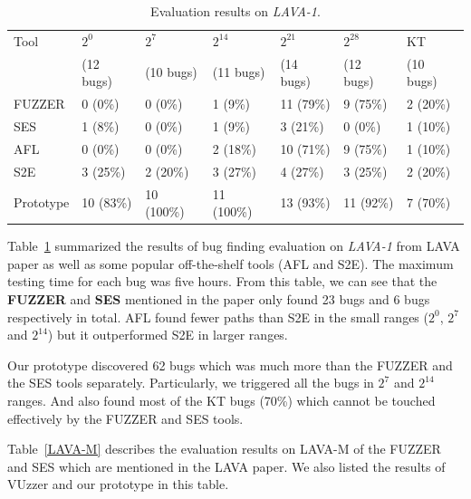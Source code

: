 \begin{table}
  \caption{\label{LAVA-1}Evaluation results on \textit{LAVA-1}.}
  \centering
	\begin{tabular}{p{2cm}<{\centering} p{1.5cm}<{\centering} p{1.6cm}<{\centering}  p{1.6cm}<{\centering}	p{1.5cm}<{\centering} p{1.5cm}<{\centering}  p{1.5cm}<{\centering} }
		\toprule
	    Tool & $2^0$ & $2^7$  & $2^{14}$ & $2^{21}$ & $2^{28}$ & KT \\
	         & (12 bugs) & (10 bugs) & (11 bugs) & (14 bugs) & (12 bugs) & (10 bugs) \\
		\midrule
		FUZZER 		& 0 (0\%)   & 0 (0\%)    & 1 (9\%)    & 11 (79\%) & 9 (75\%)  & 2 (20\%) \\
		SES	        & 1 (8\%)   & 0 (0\%)    & 1 (9\%)    & 3 (21\%)  & 0 (0\%)   & 1 (10\%) \\
		AFL		    & 0 (0\%)   & 0 (0\%)    & 2 (18\%)   & 10 (71\%) & 9 (75\%)  & 1 (10\%) \\
		S2E			& 3 (25\%)  & 2 (20\%)   & 3 (27\%)   & 4 (27\%)  & 3 (25\%)  & 2 (20\%) \\
		Prototype	& 10 (83\%) & 10 (100\%) & 11 (100\%) & 13 (93\%) & 11 (92\%) & 7 (70\%) \\
	 \bottomrule
	\end{tabular}
\end{table}

Table~\ref{LAVA-1} summarized the results of bug finding evaluation on \textit{LAVA-1} from LAVA paper as well as some popular off-the-shelf tools (AFL and S2E). The maximum testing time for each bug was five hours. From this table, we can see that the \textbf{FUZZER} and \textbf{SES} mentioned in the paper only found 23 bugs and 6 bugs respectively in total. AFL found fewer paths than S2E in the small ranges ($2^0$, $2^7$ and $2^{14}$) but it outperformed S2E in larger ranges. 

Our prototype discovered 62 bugs which was much more than the FUZZER and the SES tools separately. Particularly, we triggered all the bugs in $2^7$ and $2^{14}$ ranges. And also found most of the KT bugs (70\%) which cannot be touched effectively by the FUZZER and SES tools. 

Table~\ref{LAVA-M} describes the evaluation results on LAVA-M of the FUZZER and SES which are mentioned in the LAVA paper. We also listed the results of VUzzer and our prototype in this table. 

